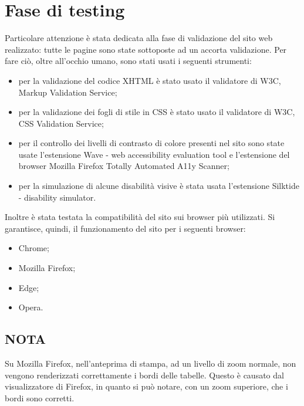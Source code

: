 \section{Fase di testing}
Particolare attenzione è stata dedicata alla fase di validazione del sito web realizzato: tutte le pagine sono state sottoposte ad un accorta validazione. Per fare ciò, oltre all'occhio umano, sono stati usati i seguenti strumenti: 
\begin{itemize}
	\item per la validazione del codice XHTML è stato usato il validatore di W3C, Markup Validation Service;
	\item per la validazione dei fogli di stile in CSS è stato usato il validatore di W3C, CSS Validation Service;
	\item per il controllo dei livelli di contrasto di colore presenti nel sito sono state usate l'estensione Wave - web accessibility evaluation tool e l'estensione del browser Mozilla Firefox Totally Automated A11y Scanner;
	\item per la simulazione di alcune disabilità visive è stata usata l'estensione Silktide - disability simulator.
\end{itemize}
Inoltre è stata testata la compatibilità del sito sui browser più utilizzati. Si garantisce, quindi, il funzionamento del sito per i seguenti browser:
\begin{itemize}
\item Chrome;
\item Mozilla Firefox;
\item Edge;
\item Opera.
\end{itemize}
\subsection{NOTA}Su Mozilla Firefox, nell'anteprima di stampa, ad un livello di zoom normale, non vengono renderizzati correttamente i bordi delle tabelle. Questo è causato dal visualizzatore di Firefox, in quanto si può notare, con un zoom superiore, che i bordi sono corretti.  